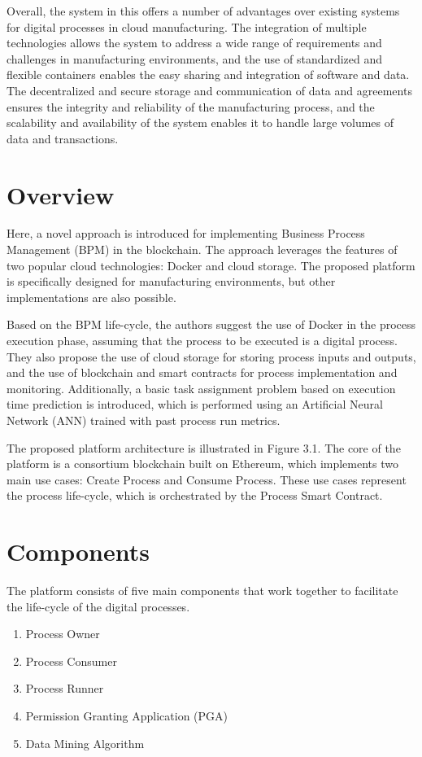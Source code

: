 \documentclass[10pt,a4paper]{report}
\begin{document}
\large\justify Overall, the system in this offers a number of advantages over existing systems for digital processes in cloud manufacturing. The integration of multiple technologies allows the system to address a wide range of requirements and challenges in manufacturing environments, and the use of standardized and flexible containers enables the easy sharing and integration of software and data. The decentralized and secure storage and communication of data and agreements ensures the integrity and reliability of the manufacturing process, and the scalability and availability of the system enables it to handle large volumes of data and transactions.

\section{Overview} 

\large\justify Here, a novel approach is introduced for implementing Business Process Management (BPM) in the blockchain. The approach leverages the features of two popular cloud technologies: Docker and cloud storage. The proposed platform is specifically designed for manufacturing environments, but other implementations are also possible.

\large\justify Based on the BPM life-cycle, the authors suggest the use of Docker in the process execution phase, assuming that the process to be executed is a digital process. They also propose the use of cloud storage for storing process inputs and outputs, and the use of blockchain and smart contracts for process implementation and monitoring. Additionally, a basic task assignment problem based on execution time prediction is introduced, which is performed using an Artificial Neural Network (ANN) trained with past process run metrics.

\large\justify The proposed platform architecture is illustrated in Figure 3.1. The core of the platform is a consortium blockchain built on Ethereum, which implements two main use cases: Create Process and Consume Process. These use cases represent the process life-cycle, which is orchestrated by the Process Smart Contract.

\section{Components}
\large\justify The platform consists of five main components that work together to facilitate the life-cycle of the digital processes.
\begin{enumerate}
    \item Process Owner
    \item Process Consumer
    \item Process Runner
    \item Permission Granting Application (PGA)
    \item Data Mining Algorithm
\end{enumerate}
\end{document}
